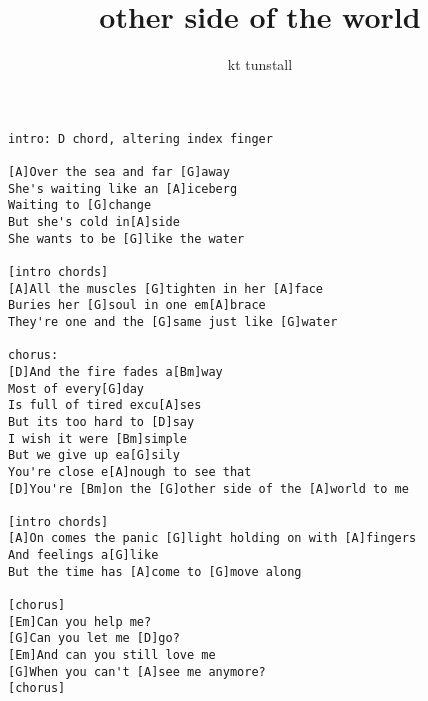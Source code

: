 \author{kt tunstall}
\title{other side of the world}
\maketitle
\begin{verbatim}
intro: D chord, altering index finger

[A]Over the sea and far [G]away
She's waiting like an [A]iceberg
Waiting to [G]change
But she's cold in[A]side
She wants to be [G]like the water

[intro chords]
[A]All the muscles [G]tighten in her [A]face
Buries her [G]soul in one em[A]brace
They're one and the [G]same just like [G]water

chorus:
[D]And the fire fades a[Bm]way
Most of every[G]day
Is full of tired excu[A]ses
But its too hard to [D]say
I wish it were [Bm]simple
But we give up ea[G]sily
You're close e[A]nough to see that
[D]You're [Bm]on the [G]other side of the [A]world to me

[intro chords]
[A]On comes the panic [G]light holding on with [A]fingers
And feelings a[G]like
But the time has [A]come to [G]move along

[chorus]
[Em]Can you help me?
[G]Can you let me [D]go?
[Em]And can you still love me
[G]When you can't [A]see me anymore?
[chorus]
\end{verbatim}